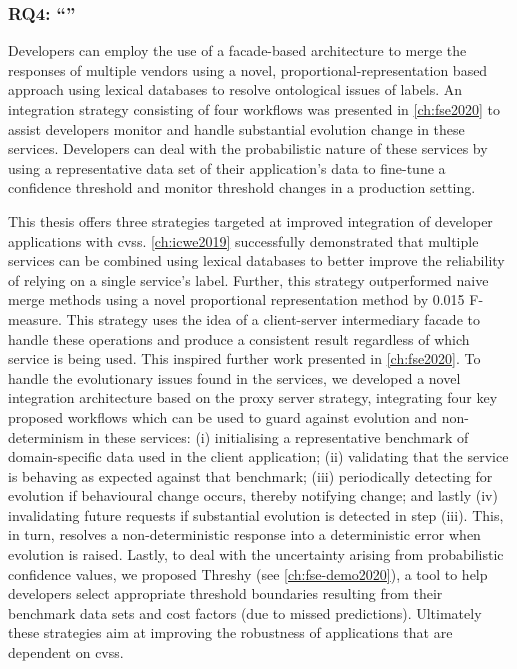 \subsubsection[Answering RQ4]{RQ4: ``\RQFourDesign{}''}
\begin{callout}
Developers can employ the use of a facade-based architecture to merge the responses of \textup{multiple} vendors using a novel, proportional-representation based approach using lexical databases to resolve ontological issues of labels. An integration strategy consisting of four workflows was presented in \cref{ch:fse2020} to assist developers monitor and handle substantial evolution change in these services. Developers can deal with the probabilistic nature of these services by using a representative data set of their application's data to fine-tune a confidence threshold and monitor threshold changes in a production setting.
\end{callout}

This thesis offers three strategies targeted at improved integration of developer applications with \glspl{cvs}. \cref{ch:icwe2019} successfully demonstrated that multiple services can be combined using lexical databases to better improve the reliability of relying on a single service's label. Further, this strategy outperformed naive merge methods using a novel proportional representation method by 0.015 F-measure. This strategy uses the idea of a client-server intermediary facade to handle these operations and produce a consistent result regardless of which service is being used. This inspired further work presented in \cref{ch:fse2020}. To handle the evolutionary issues found in the services, we developed a novel integration architecture based on the proxy server strategy, integrating four key proposed workflows which can be used to guard against evolution and non-determinism in these services: (i) initialising a representative benchmark of domain-specific data used in the client application; (ii) validating that the service is behaving as expected against that benchmark; (iii) periodically detecting for evolution if behavioural change occurs, thereby notifying change; and lastly (iv) invalidating future requests if substantial evolution is detected in step (iii). This, in turn, resolves a non-deterministic response into a deterministic error when evolution is raised. Lastly, to deal with the uncertainty arising from probabilistic confidence values, we proposed Threshy (see \cref{ch:fse-demo2020}), a tool to help developers select appropriate threshold boundaries resulting from their benchmark data sets and cost factors (due to missed predictions). Ultimately these strategies aim at improving the robustness of applications that are dependent on \glspl{cvs}.

